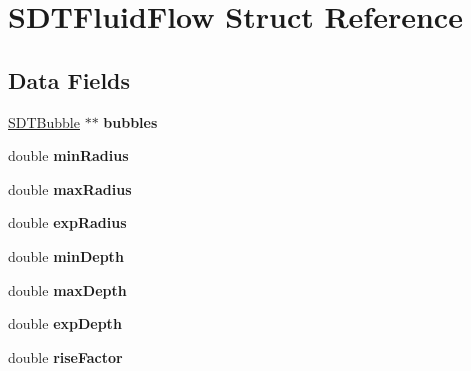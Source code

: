 \hypertarget{struct_s_d_t_fluid_flow}{}\section{S\+D\+T\+Fluid\+Flow Struct Reference}
\label{struct_s_d_t_fluid_flow}
\subsection*{Data Fields}
\begin{DoxyCompactItemize}
\item 
\hypertarget{struct_s_d_t_fluid_flow_a5007f12bf7cb8f2b64f4fea99125387b}{}\hyperlink{struct_s_d_t_bubble}{S\+D\+T\+Bubble} $\ast$$\ast$ {\bfseries bubbles}\label{struct_s_d_t_fluid_flow_a5007f12bf7cb8f2b64f4fea99125387b}

\item 
\hypertarget{struct_s_d_t_fluid_flow_afaab98fae8b618c35e0a96f1c651f2a8}{}double {\bfseries min\+Radius}\label{struct_s_d_t_fluid_flow_afaab98fae8b618c35e0a96f1c651f2a8}

\item 
\hypertarget{struct_s_d_t_fluid_flow_a55fa5e582605722608935652630ea60f}{}double {\bfseries max\+Radius}\label{struct_s_d_t_fluid_flow_a55fa5e582605722608935652630ea60f}

\item 
\hypertarget{struct_s_d_t_fluid_flow_a38a0ca22b21c72ebbd3b4f93af174432}{}double {\bfseries exp\+Radius}\label{struct_s_d_t_fluid_flow_a38a0ca22b21c72ebbd3b4f93af174432}

\item 
\hypertarget{struct_s_d_t_fluid_flow_a553109488119f08750b87dab552c31e5}{}double {\bfseries min\+Depth}\label{struct_s_d_t_fluid_flow_a553109488119f08750b87dab552c31e5}

\item 
\hypertarget{struct_s_d_t_fluid_flow_a6a4fdafe2923ec0b425ce0041a23119b}{}double {\bfseries max\+Depth}\label{struct_s_d_t_fluid_flow_a6a4fdafe2923ec0b425ce0041a23119b}

\item 
\hypertarget{struct_s_d_t_fluid_flow_aa113e7e08edc0f8b071d99722d0f34f6}{}double {\bfseries exp\+Depth}\label{struct_s_d_t_fluid_flow_aa113e7e08edc0f8b071d99722d0f34f6}

\item 
\hypertarget{struct_s_d_t_fluid_flow_ae622d0f01b7e8bf1f3f56a4c46452ed9}{}double {\bfseries rise\+Factor}\label{struct_s_d_t_fluid_flow_ae622d0f01b7e8bf1f3f56a4c46452ed9}


\end{DoxyCompactItemize}
